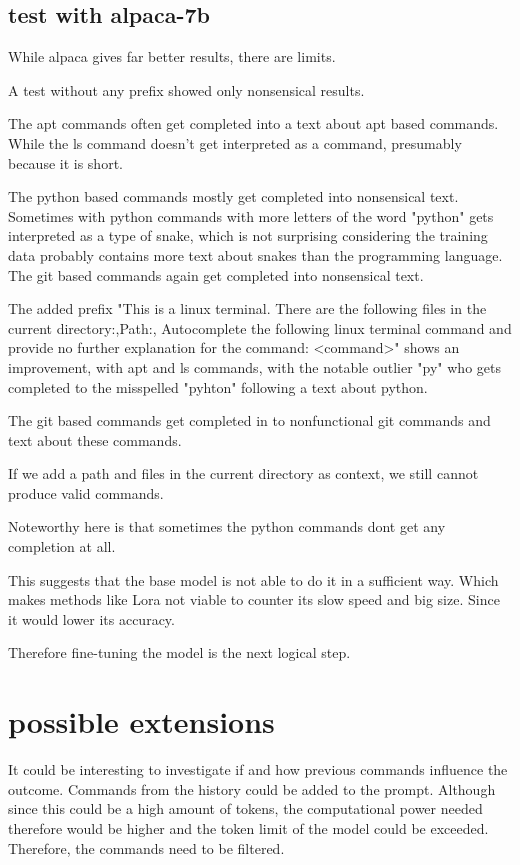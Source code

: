 \subsection{test with alpaca-7b}
While alpaca gives far better results, there are limits.


A test without any prefix showed only nonsensical results.

The apt commands often get completed into a text about apt based commands. While the ls command doesn't get interpreted as a command, presumably because it is short.

The python based commands mostly get completed into nonsensical text. Sometimes with python commands with more letters of the word "python" gets interpreted as a type of snake, which is not surprising considering the training data probably contains more text about snakes than the programming language. The git based commands again get completed into nonsensical text.


The added prefix  "This is a linux terminal. There are the following files in the current  directory:,Path:, Autocomplete the following linux terminal command and provide no further explanation for the command: <command>" shows an improvement, with apt and ls commands, with the notable outlier "py" who gets completed to the misspelled "pyhton" following a text about python.

The git based commands get completed in to nonfunctional git commands and text about these commands.


If we add a path and files in the current directory as context, we still cannot produce valid commands.

Noteworthy here is that sometimes the python commands dont get any completion at all.


This suggests that the base model is not able to do it in a sufficient way. Which makes methods like Lora not viable 
 to counter its slow speed and big size. Since it would lower its accuracy. 

Therefore fine-tuning the model is the next logical step.

\section{possible extensions}

It could be interesting to investigate if and how previous commands influence the outcome. Commands from the history could be added to the prompt. Although since this could be a high amount of tokens, the computational power needed therefore would be higher and the token limit of the model could be exceeded. Therefore, the commands need to be filtered. 



